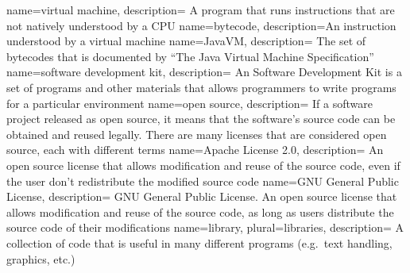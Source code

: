 {
    name={virtual machine},
    description=
    {
        A program that runs instructions that are not natively understood by a
        CPU
    }
}
{
    name=bytecode,
    description={An instruction understood by a virtual machine}
}
{
    name=JavaVM,
    description=
    {
        The set of bytecodes that is documented by ``The Java Virtual
        Machine Specification'' \cite{javavm-bytecode}
    }
}
{
    name={software development kit},
    description=
    {
        An Software Development Kit is a set of programs and other materials
        that allows programmers to write programs for a particular environment
    }
}
{
    name={open source},
    description=
    {
        If a software project released as open source, it means that the
        software's source code can be obtained and reused legally.  There are
        many licenses that are considered open source, each with different
        terms
    }
}
{
    name={Apache License 2.0},
    description=
    {
        An open source license that allows modification and reuse of the source
        code, even if the user don't redistribute the modified source code
        \cite{apache-license}
    }
}
{
    name={GNU General Public License},
    description=
    {
        GNU General Public License.  An open source license that allows
        modification and reuse of the source code, as long as users distribute
        the source code of their modifications \cite{gpl-license}
    }
}
{
    name=library,
    plural=libraries,
    description=
    {
        A collection of code that is useful in many different programs (e.g.\
        text handling, graphics, etc.)
    }
}
